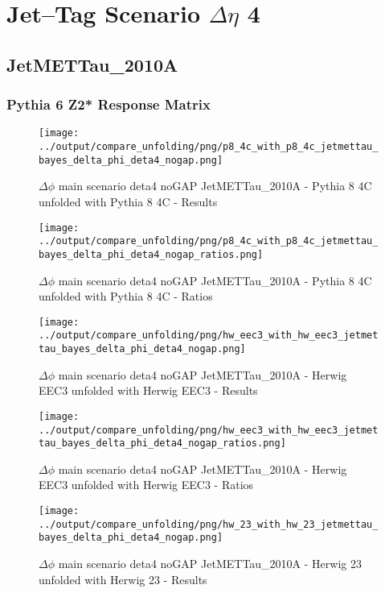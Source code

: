 \documentclass[11pt]{book}
\begin{document}
\newpage
\chapter{Jet--Tag Scenario $\Delta\eta$ 4}
\section{JetMETTau\_2010A}
\subsection{Pythia 6 Z2* Response Matrix}


\begin{figure}[ht]
\centering
\texttt{[image: ../output/compare\_unfolding/png/p8\_4c\_with\_p8\_4c\_jetmettau\_bayes\_delta\_phi\_deta4\_nogap.png]}
\caption{$\Delta\phi$ main scenario deta4 noGAP JetMETTau\_2010A - Pythia 8 4C unfolded with Pythia 8 4C - Results}
\label{p8_p8_jetmettau_bayes_delta_phi_deta4_nogap_a}
\end{figure}

\begin{figure}[ht]
\centering
\texttt{[image: ../output/compare\_unfolding/png/p8\_4c\_with\_p8\_4c\_jetmettau\_bayes\_delta\_phi\_deta4\_nogap\_ratios.png]}
\caption{$\Delta\phi$ main scenario deta4 noGAP JetMETTau\_2010A - Pythia 8 4C unfolded with Pythia 8 4C - Ratios}
\label{p8_p8_jetmettau_bayes_delta_phi_deta4_nogap_b}
\end{figure}

\begin{figure}[ht]
\centering
\texttt{[image: ../output/compare\_unfolding/png/hw\_eec3\_with\_hw\_eec3\_jetmettau\_bayes\_delta\_phi\_deta4\_nogap.png]}
\caption{$\Delta\phi$ main scenario deta4 noGAP JetMETTau\_2010A - Herwig EEC3 unfolded with Herwig EEC3 - Results}
\label{hw_eec3_hw_eec3_jetmettau_bayes_delta_phi_deta4_nogap_a}
\end{figure}

\begin{figure}[ht]
\centering
\texttt{[image: ../output/compare\_unfolding/png/hw\_eec3\_with\_hw\_eec3\_jetmettau\_bayes\_delta\_phi\_deta4\_nogap\_ratios.png]}
\caption{$\Delta\phi$ main scenario deta4 noGAP JetMETTau\_2010A - Herwig EEC3 unfolded with Herwig EEC3 - Ratios}
\label{hw_eec3_hw_eec3_jetmettau_bayes_delta_phi_deta4_nogap_b}
\end{figure}

\begin{figure}[ht]
\centering
\texttt{[image: ../output/compare\_unfolding/png/hw\_23\_with\_hw\_23\_jetmettau\_bayes\_delta\_phi\_deta4\_nogap.png]}
\caption{$\Delta\phi$ main scenario deta4 noGAP JetMETTau\_2010A - Herwig 23 unfolded with Herwig 23 - Results}
\label{hw_23_hw_23_jetmettau_bayes_delta_phi_deta4_nogap_a}
\end{figure}
\end{document}

